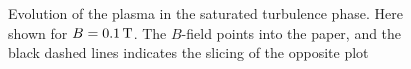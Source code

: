 {\begin{figure}[htbp]
\begin{subfigure}[h]{1.00\textwidth}
    \end{subfigure}
    \caption{Evolution of the plasma in the saturated turbulence phase.
        Here shown for $B=0.1\, \text{T}$.
        The $B$-field points into the paper, and the black dashed lines indicates the slicing of the opposite plot
    }
    \label{fig:turbEv}
\end{figure}
\clearpage
}
%
